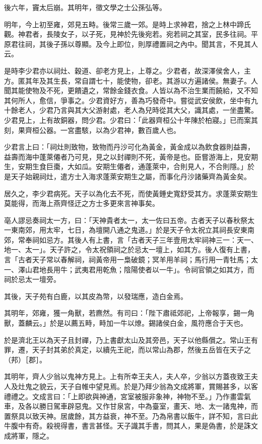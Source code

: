 \begin{pinyinscope}
後六年，竇太后崩。其明年，徵文學之士公孫弘等。

明年，今上初至雍，郊見五畤。後常三歲一郊。是時上求神君，捨之上林中蹄氏觀。神君者，長陵女子，以子死，見神於先後宛若。宛若祠之其室，民多往祠。平原君往祠，其後子孫以尊顯。及今上即位，則厚禮置祠之內中。聞其言，不見其人云。

是時李少君亦以祠灶、穀道、卻老方見上，上尊之。少君者，故深澤侯舍人，主方。匿其年及其生長，常自謂七十，能使物，卻老。其游以方遍諸侯。無妻子。人聞其能使物及不死，更饋遺之，常餘金錢衣食。人皆以為不治生業而饒給，又不知其何所人，愈信，爭事之。少君資好方，善為巧發奇中。嘗從武安侯飲，坐中有九十餘老人，少君乃言與其大父游射處，老人為兒時從其大父，識其處，一坐盡驚。少君見上，上有故銅器，問少君。少君曰：「此器齊桓公十年陳於柏寢。」已而案其刻，果齊桓公器。一宮盡駭，以為少君神，數百歲人也。

少君言上曰：「祠灶則致物，致物而丹沙可化為黃金，黃金成以為飲食器則益壽，益壽而海中蓬萊僊者乃可見，見之以封禪則不死，黃帝是也。臣嘗游海上，見安期生，安期生食巨棗，大如瓜。安期生僊者，通蓬萊中，合則見人，不合則隱。」於是天子始親祠灶，遣方士入海求蓬萊安期生之屬，而事化丹沙諸藥齊為黃金矣。

居久之，李少君病死。天子以為化去不死，而使黃錘史寬舒受其方。求蓬萊安期生莫能得，而海上燕齊怪迂之方士多更來言神事矣。

亳人謬忌奏祠太一方，曰：「天神貴者太一，太一佐曰五帝。古者天子以春秋祭太一東南郊，用太牢，七日，為壇開八通之鬼道。」於是天子令太祝立其祠長安東南郊，常奉祠如忌方。其後人有上書，言「古者天子三年壹用太牢祠神三一：天一、地一、太一」。天子許之，令太祝領祠之於忌太一壇上，如其方。後人復有上書，言「古者天子常以春解祠，祠黃帝用一梟破鏡；冥羊用羊祠；馬行用一青牡馬；太一、澤山君地長用牛；武夷君用乾魚；陰陽使者以一牛」。令祠官領之如其方，而祠於忌太一壇旁。

其後，天子苑有白鹿，以其皮為幣，以發瑞應，造白金焉。

其明年，郊雍，獲一角獸，若麃然。有司曰：「陛下肅祗郊祀，上帝報享，錫一角獸，蓋麟云。」於是以薦五畤，畤加一牛以燎。錫諸侯白金，風符應合于天也。

於是濟北王以為天子且封禪，乃上書獻太山及其旁邑，天子以他縣償之。常山王有罪，遷，天子封其弟於真定，以續先王祀，而以常山為郡，然後五岳皆在天子之（邦）［郡］。

其明年，齊人少翁以鬼神方見上。上有所幸王夫人，夫人卒，少翁以方蓋夜致王夫人及灶鬼之貌云，天子自帷中望見焉。於是乃拜少翁為文成將軍，賞賜甚多，以客禮禮之。文成言曰：「上即欲與神通，宮室被服非象神，神物不至。」乃作畫雲氣車，及各以勝日駕車辟惡鬼。又作甘泉宮，中為臺室，畫天、地、太一諸鬼神，而置祭具以致天神。居歲餘，其方益衰，神不至。乃為帛書以飯牛，詳不知，言曰此牛腹中有奇。殺視得書，書言甚怪。天子識其手書，問其人，果是偽書，於是誅文成將軍，隱之。


\end{pinyinscope}
